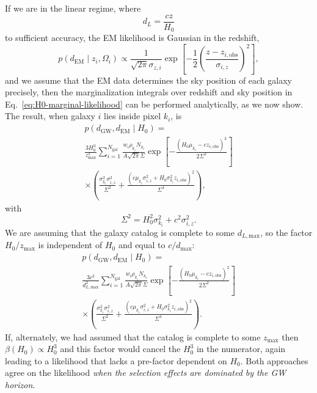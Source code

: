 \documentclass[modern]{aastex62}
\newcommand{\dEM}{d_{\mathrm{EM}}}
\newcommand{\dGW}{d_{\mathrm{GW}}}
\newcommand{\Ngal}{N_{\mathrm{gal}}}
\begin{document}
If we are in the linear regime, where
%
\begin{equation}
    d_L = \frac{c z}{H_0}
\end{equation}
%
to sufficient accuracy, the \ac{EM} likelihood is Gaussian in the redshift,
%
\begin{equation}
    p\left( \dEM \mid z_i, \Omega_i \right) \propto \frac{1}{\sqrt{2\pi} \sigma_{z,i}} \exp\left[ -\frac{1}{2} \left( \frac{z - z_{i,\mathrm{obs}}}{\sigma_{i,z}} \right)^2 \right],
\end{equation}
%
and we assume that the \ac{EM} data determines the sky position of each galaxy
precisely, then the marginalization integrals over redshift and sky position in
Eq.\ \eqref{eq:H0-marginal-likelihood} can be performed analytically, as we now
show. The result, when galaxy $i$ lies inside pixel $k_i$, is
%
\begin{multline}
     p\left( \dGW, \dEM \mid H_0 \right) = \\ \frac{3 H_0^3}{z_\mathrm{max}^3} \sum_{i=1}^{\Ngal} \frac{w_i \rho_{k_i} N_{k_i}}{A \sqrt{2\pi} \Sigma} \exp\left[ -\frac{\left(H_0 \mu_{k_i} - c z_{i,\mathrm{obs}}\right)^2}{2 \Sigma^2} \right] \\ \times \left( \frac{\sigma_{k_i}^2 \sigma_{i,z}^2}{\Sigma^2} + \frac{\left( c \mu_{k_i} \sigma_{i,z}^2 + H_0 \sigma_{k_i}^2 z_{i,\mathrm{obs}} \right)^2}{\Sigma^4} \right),
\end{multline}
%
with
%
\begin{equation}
    \Sigma^2 = H_0^2 \sigma_{k_i}^2 + c^2 \sigma_{i,z}^2.
\end{equation}
%
We are assuming that the galaxy catalog is complete to some $d_{L,
\mathrm{max}}$, so the factor $H_0/z_\mathrm{max}$ is independent of $H_0$ and
equal to $c/d_\mathrm{max}$:
%
\begin{multline}
  p\left( \dGW, \dEM \mid H_0 \right) = \\ \frac{3 c^3}{d_{L,\mathrm{max}}^3} \sum_{i=1}^{\Ngal} \frac{w_i \rho_{k_i} N_{k_i}}{A \sqrt{2\pi} \Sigma} \exp\left[ -\frac{\left(H_0 \mu_{k_i} - c z_{i,\mathrm{obs}}\right)^2}{2 \Sigma^2} \right] \\ \times \left( \frac{\sigma_{k_i}^2 \sigma_{i,z}^2}{\Sigma^2} + \frac{\left( c \mu_{k_i} \sigma_{i,z}^2 + H_0 \sigma_{k_i}^2 z_{i,\mathrm{obs}} \right)^2}{\Sigma^4} \right).
\end{multline}
%
If, alternately, we had assumed that the catalog is complete to some
$z_\mathrm{max}$ then $\beta\left( H_0 \right) \propto H_0^3$ and this factor
would cancel the $H_0^3$ in the numerator, again leading to a likelihood that
lacks a pre-factor dependent on $H_0$.  Both approaches agree on the likelihood
\emph{when the selection effects are dominated by the \ac{GW} horizon}.
\end{document}
